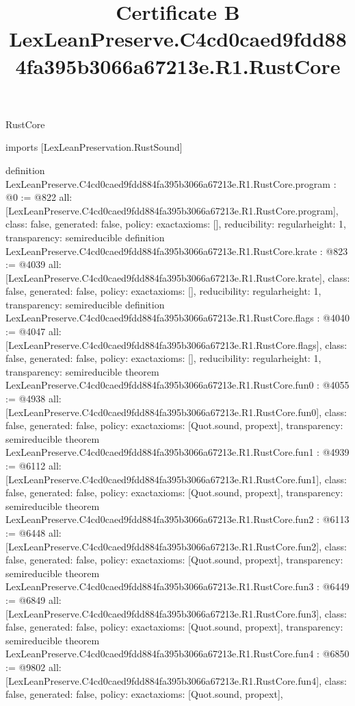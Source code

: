 \begin{lexlean}{RustCore}
\title{Certificate B LexLeanPreserve.C4cd0caed9fdd884fa395b3066a67213e.R1.RustCore}
\begin{coremodule}
imports [LexLeanPreservation.RustSound]

definition LexLeanPreserve.C4cd0caed9fdd884fa395b3066a67213e.R1.RustCore.program : @0 := @822 {
  all: [LexLeanPreserve.C4cd0caed9fdd884fa395b3066a67213e.R1.RustCore.program],
  class: false,
  generated: false,
  policy: exact{axioms: []},
  reducibility: regular{height: 1},
  transparency: semireducible
}
definition LexLeanPreserve.C4cd0caed9fdd884fa395b3066a67213e.R1.RustCore.krate : @823 := @4039 {
  all: [LexLeanPreserve.C4cd0caed9fdd884fa395b3066a67213e.R1.RustCore.krate],
  class: false,
  generated: false,
  policy: exact{axioms: []},
  reducibility: regular{height: 1},
  transparency: semireducible
}
definition LexLeanPreserve.C4cd0caed9fdd884fa395b3066a67213e.R1.RustCore.flags : @4040 := @4047 {
  all: [LexLeanPreserve.C4cd0caed9fdd884fa395b3066a67213e.R1.RustCore.flags],
  class: false,
  generated: false,
  policy: exact{axioms: []},
  reducibility: regular{height: 1},
  transparency: semireducible
}
theorem LexLeanPreserve.C4cd0caed9fdd884fa395b3066a67213e.R1.RustCore.fun0 : @4055 := @4938 {
  all: [LexLeanPreserve.C4cd0caed9fdd884fa395b3066a67213e.R1.RustCore.fun0],
  class: false,
  generated: false,
  policy: exact{axioms: [Quot.sound, propext]},
  transparency: semireducible
}
theorem LexLeanPreserve.C4cd0caed9fdd884fa395b3066a67213e.R1.RustCore.fun1 : @4939 := @6112 {
  all: [LexLeanPreserve.C4cd0caed9fdd884fa395b3066a67213e.R1.RustCore.fun1],
  class: false,
  generated: false,
  policy: exact{axioms: [Quot.sound, propext]},
  transparency: semireducible
}
theorem LexLeanPreserve.C4cd0caed9fdd884fa395b3066a67213e.R1.RustCore.fun2 : @6113 := @6448 {
  all: [LexLeanPreserve.C4cd0caed9fdd884fa395b3066a67213e.R1.RustCore.fun2],
  class: false,
  generated: false,
  policy: exact{axioms: [Quot.sound, propext]},
  transparency: semireducible
}
theorem LexLeanPreserve.C4cd0caed9fdd884fa395b3066a67213e.R1.RustCore.fun3 : @6449 := @6849 {
  all: [LexLeanPreserve.C4cd0caed9fdd884fa395b3066a67213e.R1.RustCore.fun3],
  class: false,
  generated: false,
  policy: exact{axioms: [Quot.sound, propext]},
  transparency: semireducible
}
theorem LexLeanPreserve.C4cd0caed9fdd884fa395b3066a67213e.R1.RustCore.fun4 : @6850 := @9802 {
  all: [LexLeanPreserve.C4cd0caed9fdd884fa395b3066a67213e.R1.RustCore.fun4],
  class: false,
  generated: false,
  policy: exact{axioms: [Quot.sound, propext]},
}
\end{coremodule}
\end{lexlean}
